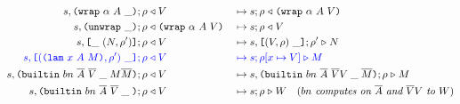 \begin{figure*}[!ht]
\begin{subfigure}[c]{\linewidth}
{\begin{alignat*}{2}
      s,\inWrapRightFrame{\alpha}{A}; \rho &\return V &{}\mapsto{}& s;\rho \return \wrap{\alpha}{A}{V}\\
      s,\inUnwrapFrame{}; \rho &\return \wrap{\alpha}{A}{V} &{}\mapsto{}& s;\rho \return V\\
      s,\inAppLeftFrame{(N,\rho^{\prime})}; \rho &\return V &{}\mapsto{}& s, \inAppRightFrame{(V,\rho)};\rho^{\prime} \compute N\\
      \blue{s,\inAppRightFrame{(\lam{x}{A}{M}, \rho^{\prime})}; \rho} &\breturn V &{}\bmapsto{}& \blue{s;\rho[x\mapsto V] \compute M}\\  %
      s,  \inBuiltin{bn}{\repetition{A}}{\repetition{V}}{\_}{M \repetition{M}}{}; \rho&\return V &{}\mapsto{}& s, \inBuiltin{bn}{\repetition{A}}{\repetition{V} V}{\_}{\repetition{M}};\rho \compute M\\
      s,\inBuiltin {bn} {\repetition{A}} {\repetition{V}}{\_}{}; \rho &\return V 
                                                &{}\mapsto{}& s;\rho \compute W \quad (\textit{$bn$ computes on $\repetition{A}$ and $\repetition{V}V$ to $W$})\\
\end{alignat*}
}
\end{subfigure}
\end{figure*}


\begin{comment}
computeCek con (Apply _ fun arg)      = do
    varEnv <- getVarEnv
    computeCek (FrameApplyArg varEnv arg : con) fun
computeCek con (Var _ varName)        = do
computeCek con bi@Builtin{} = returnCek con bi

-- | The returning part of the CEK machine.
-- Returns 'EvaluationSuccess' in case the context is empty, otherwise pops up one frame
-- from the context and either
-- 1. performs reduction and calls 'computeCek' ('FrameTyInstArg', 'FrameApplyFun', 'FrameUnwrap')
-- 2. performs a constant application and calls 'returnCek' ('FrameTyInstArg', 'FrameApplyFun')
-- 3. puts 'FrameApplyFun' on top of the context and proceeds with the argument from 'FrameApplyArg'
-- 4. grows the resulting term ('FrameWrap')
returnCek :: Context -> Plain Value -> CekM EvaluationResult
returnCek []                                  res = pure $ EvaluationSuccess res
returnCek (FrameTyInstArg ty           : con) fun = instantiateEvaluate con ty fun
returnCek (FrameApplyArg argVarEnv arg : con) fun = do
    funVarEnv <- getVarEnv
    withVarEnv argVarEnv $ computeCek (FrameApplyFun funVarEnv fun : con) arg
returnCek (FrameApplyFun funVarEnv fun : con) arg = do
    argVarEnv <- getVarEnv
    applyEvaluate funVarEnv argVarEnv con fun arg
returnCek (FrameWrap ann tyn ty        : con) val = returnCek con $ Wrap ann tyn ty val
returnCek (FrameUnwrap                 : con) dat = case dat of
    Wrap _ _ _ term -> returnCek con term
    term            -> throwError $ MachineException NonWrapUnwrappedMachineError term

\end{comment}

